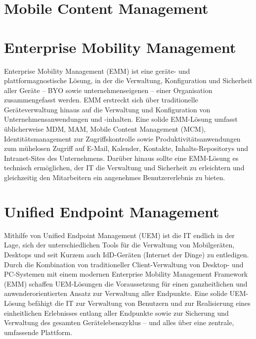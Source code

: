 \section{Mobile Content Management}

\section{Enterprise Mobility Management}
Enterprise Mobility Management (EMM) ist eine geräte- und plattformagnostische Lösung, in der die Verwaltung, Konfiguration und Sicherheit aller Geräte – BYO sowie unternehmenseigenen – einer Organisation zusammengefasst werden. EMM erstreckt sich über traditionelle Geräteverwaltung hinaus auf die Verwaltung und Konfiguration von Unternehmensanwendungen und -inhalten.  Eine solide EMM-Lösung umfasst üblicherweise MDM, MAM, Mobile Content Management (MCM), Identitätsmanagement zur Zugriffskontrolle sowie Produktivitätsanwendungen zum mühelosen Zugriff auf E-Mail, Kalender, Kontakte, Inhalts-Repositorys und Intranet-Sites des Unternehmens. Darüber hinaus sollte eine EMM-Lösung es technisch ermöglichen, der IT die Verwaltung und Sicherheit zu erleichtern und gleichzeitig den Mitarbeitern ein angenehmes Benutzererlebnis zu bieten. 

\section{Unified Endpoint Management}
Mithilfe von Unified Endpoint Management (UEM) ist die IT endlich in der Lage, sich der unterschiedlichen Tools für die Verwaltung von Mobilgeräten, Desktops und seit Kurzem auch IdD-Geräten (Internet der Dinge) zu entledigen. Durch die Kombination von traditioneller Client-Verwaltung von Desktop- und PC-Systemen mit einem modernen Enterprise Mobility Management Framework (EMM) schaffen UEM-Lösungen die Voraussetzung für einen ganzheitlichen und anwenderorientierten Ansatz zur Verwaltung aller Endpunkte. Eine solide UEM-Lösung befähigt die IT zur Verwaltung von Benutzern und zur Realisierung eines einheitlichen Erlebnisses entlang aller Endpunkte sowie zur Sicherung und Verwaltung des gesamten Gerätelebenszyklus – und alles über eine zentrale, umfassende Plattform. 






